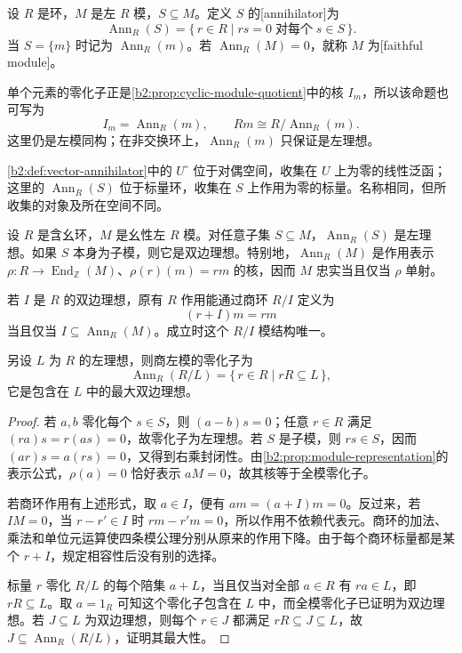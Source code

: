 \begin{definition}\label{b2:def:annihilator-faithful}
	设 \(R\) 是环，\(M\) 是左 \(R\) 模，\(S\subseteq M\)。定义 \(S\) 的[annihilator]为
	\[
		\operatorname{Ann}_R(S)=\{\,r\in R\mid rs=0\;\text{对每个}\;s\in S\,\}.
	\]
	当 \(S=\{m\}\) 时记为 \(\operatorname{Ann}_R(m)\)。若 \(\operatorname{Ann}_R(M)=0\)，就称 \(M\) 为[faithful module]。
\end{definition}

单个元素的零化子正是\cref{b2:prop:cyclic-module-quotient}中的核 \(I_m\)，所以该命题也可写为
\[
	I_m=\operatorname{Ann}_R(m),\qquad Rm\cong R/\operatorname{Ann}_R(m).
\]
这里仍是左模同构；在非交换环上，\(\operatorname{Ann}_R(m)\) 只保证是左理想。

\ProseParagraphBreak
\cref{b2:def:vector-annihilator}中的 \(U^\circ\) 位于对偶空间，收集在 \(U\) 上为零的线性泛函；这里的 \(\operatorname{Ann}_R(S)\) 位于标量环，收集在 \(S\) 上作用为零的标量。名称相同，但所收集的对象及所在空间不同。

\begin{proposition}\label{b2:prop:annihilator-ideals}
	设 \(R\) 是含幺环，\(M\) 是幺性左 \(R\) 模。对任意子集 \(S\subseteq M\)，\(\operatorname{Ann}_R(S)\) 是左理想。如果 \(S\) 本身为子模，则它是双边理想。特别地，\(\operatorname{Ann}_R(M)\) 是作用表示 \(\rho:R\to\operatorname{End}_{\mathbb Z}(M)\)、\(\rho(r)(m)=rm\) 的核，因而 \(M\) 忠实当且仅当 \(\rho\) 单射。

	若 \(I\) 是 \(R\) 的双边理想，原有 \(R\) 作用能通过商环 \(R/I\) 定义为
	\[
		(r+I)m=rm
	\]
	当且仅当 \(I\subseteq\operatorname{Ann}_R(M)\)。成立时这个 \(R/I\) 模结构唯一。

	另设 \(L\) 为 \(R\) 的左理想，则商左模的零化子为
	\[
		\operatorname{Ann}_R(R/L)=\{\,r\in R\mid rR\subseteq L\,\},
	\]
	它是包含在 \(L\) 中的最大双边理想。
\end{proposition}
\begin{proof}
	若 \(a,b\) 零化每个 \(s\in S\)，则 \((a-b)s=0\)；任意 \(r\in R\) 满足 \((ra)s=r(as)=0\)，故零化子为左理想。若 \(S\) 是子模，则 \(rs\in S\)，因而 \((ar)s=a(rs)=0\)，又得到右乘封闭性。由\cref{b2:prop:module-representation}的表示公式，\(\rho(a)=0\) 恰好表示 \(aM=0\)，故其核等于全模零化子。

	若商环作用有上述形式，取 \(a\in I\)，便有 \(am=(a+I)m=0\)。反过来，若 \(IM=0\)，当 \(r-r'\in I\) 时 \(rm-r'm=0\)，所以作用不依赖代表元。商环的加法、乘法和单位元运算使四条模公理分别从原来的作用下降。由于每个商环标量都是某个 \(r+I\)，规定相容性后没有别的选择。

	标量 \(r\) 零化 \(R/L\) 的每个陪集 \(a+L\)，当且仅当对全部 \(a\in R\) 有 \(ra\in L\)，即 \(rR\subseteq L\)。取 \(a=1_R\) 可知这个零化子包含在 \(L\) 中，而全模零化子已证明为双边理想。若 \(J\subseteq L\) 为双边理想，则每个 \(r\in J\) 都满足 \(rR\subseteq J\subseteq L\)，故 \(J\subseteq\operatorname{Ann}_R(R/L)\)，证明其最大性。
\end{proof}

